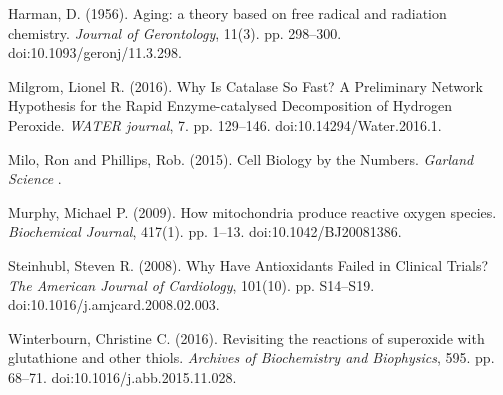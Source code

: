\documentclass[preprint,12pt,authoryear]{elsarticle}
\begin{document}
\begin{thebibliography}{00}
{Harman, D}.
(1956).
Aging: a theory based on free radical and radiation chemistry.
{\em Journal of Gerontology},  11(3).
pp. {298--300}.
doi:10.1093/geronj/11.3.298.

Milgrom, Lionel R.
(2016).
Why Is Catalase So Fast? A Preliminary Network Hypothesis for the Rapid Enzyme-catalysed Decomposition of Hydrogen Peroxide.
{\em WATER journal}, 7.
pp. 129--146.
doi:10.14294/Water.2016.1.

Milo, Ron and Phillips, Rob.
(2015).
Cell Biology by the Numbers.
{\em Garland Science }.

Murphy, Michael P.
(2009).
How mitochondria produce reactive oxygen species.
{ \em Biochemical Journal},  417(1).
pp. {1--13}.
doi:10.1042/BJ20081386.

Steinhubl, Steven R.
(2008).
Why Have Antioxidants Failed in Clinical Trials?
{\em The American Journal of Cardiology},  101(10).
pp. S14--S19.
doi:10.1016/j.amjcard.2008.02.003.


Winterbourn, Christine C.
(2016).
Revisiting the reactions of superoxide with glutathione and other thiols.
{ \em Archives of Biochemistry and Biophysics},  595.
pp. {68--71}.
doi:10.1016/j.abb.2015.11.028.


%
\end{thebibliography}
\end{document}
